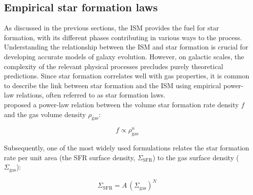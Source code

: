 \subsection{Empirical star formation laws}
\label{sec:sfr_ism_relationship}

As discussed in the previous sections, the ISM provides the fuel for star formation, with its different phases contributing in various ways to the process. Understanding the relationship between the ISM and star formation is crucial for developing accurate models of galaxy evolution. However, on galactic scales, the complexity of the relevant physical processes precludes purely theoretical predictions. Since star formation correlates well with gas properties, it is common to describe the link between star formation and the ISM using empirical power-law relations, often referred to as star formation laws.\\\indent
\citet{Schmidt1959, Schmidt1963} proposed a power-law relation between the volume star formation rate density $f$ and the gas volume density $\rho_{\mathrm{gas}}$:

\begin{equation}
    f \propto \rho_{\mathrm{gas}}^n
\end{equation}

\noindent Subsequently, one of the most widely used formulations relates the star formation rate per unit area (the SFR surface density, $\Sigma_{\mathrm{SFR}}$) to the gas surface density ($\Sigma_{\mathrm{gas}}$):

\begin{equation}
    \Sigma_{\mathrm{SFR}} = A\,(\Sigma_{\mathrm{gas}})^N
    \label{eq:SFLaw}
\end{equation}


